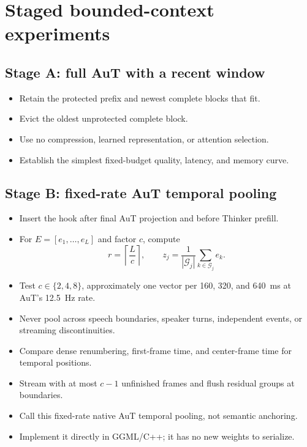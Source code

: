 \documentclass[10pt,letterpaper]{article}
\begin{document}
\section{Staged bounded-context experiments}

\subsection{Stage A: full AuT with a recent window}
\begin{itemize}
    \item Retain the protected prefix and newest complete blocks that fit.
    \item Evict the oldest unprotected complete block.
    \item Use no compression, learned representation, or attention selection.
    \item Establish the simplest fixed-budget quality, latency, and memory curve.
\end{itemize}

\subsection{Stage B: fixed-rate AuT temporal pooling}
\begin{itemize}
    \item Insert the hook after final AuT projection and before Thinker prefill.
    \item For $E=[e_1,\ldots,e_L]$ and factor $c$, compute
    \[
    r=\left\lceil\frac{L}{c}\right\rceil,\qquad
    z_j=\frac{1}{|\mathcal G_j|}\sum_{k\in\mathcal G_j}e_k.
    \]
    \item Test $c\in\{2,4,8\}$, approximately one vector per 160, 320, and 640~ms at AuT's 12.5~Hz rate.
    \item Never pool across speech boundaries, speaker turns, independent events, or streaming discontinuities.
    \item Compare dense renumbering, first-frame time, and center-frame time for temporal positions.
    \item Stream with at most $c-1$ unfinished frames and flush residual groups at boundaries.
    \item Call this fixed-rate native AuT temporal pooling, not semantic anchoring.
    \item Implement it directly in GGML/C++; it has no new weights to serialize.
\end{itemize}
\end{document}
